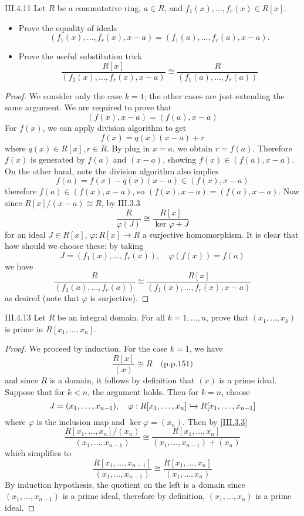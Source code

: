 \begin{problem}{III.4.11}
Let $R$ be a commutative ring, $a \in R$, and $f_1(x),\dotsc,f_r(x) \in R[x]$.
\begin{itemize}
\setlength\itemsep{0pt}
\item Prove the equality of ideals
\[
(f_1(x),\dotsc,f_r(x),x-a) = (f_1(a),\dotsc,f_r(a),x-a).
\]
\item Prove the useful substitution trick
\[
\frac{R[x]}{(f_1(x),\dotsc,f_r(x),x-a)} \cong \frac{R}{(f_1(a),\dotsc,f_r(a))}
\]
\end{itemize}
\end{problem}
\begin{proof}
We consider only the case $k = 1$; the other cases are just extending the same argument. We are required to prove that 
\[
(f(x), x-a) = (f(a), x-a)
\]
For $f(x)$, we can apply division algorithm to get
\[
f(x) = q(x)(x-a) + r
\]
where $q(x) \in R[x], r \in R$. By plug in $x = a$, we obtain $r = f(a)$. Therefore $f(x)$ is generated by $f(a)$ and $(x-a)$, showing $f(x)\in (f(a), x-a)$. On the other hand, note the division algorithm also implies
\[
f(a) = f(x) - q(x)(x-a) \in (f(x), x-a)
\]
therefore $f(a) \in (f(x), x-a)$, so $(f(x), x-a) = (f(a), x-a)$. Now since $R[x]/(x-a) \cong R$, by III.3.3
\[
\frac{R}{\varphi(J)} \cong \frac{R[x]}{\ker \varphi + J}	
\]
for an ideal $J \in R[x]$, $\varphi : R[x] \to R$ a surjective homomorphism. It is clear that how should we choose these: by taking
\[
J = (f_1(x),\dotsc,f_r(x)), \quad \varphi(f(x)) = f(a)	
\]
we have
\[
\frac{R}{(f_1(a),\dotsc,f_r(a))} \cong \frac{R[x]}{(f_1(x),\dotsc,f_r(x),x-a)} 
\]
as desired (note that $\varphi$ is surjective).
\end{proof}

\begin{problem}{III.4.13}
Let $R$ be an integral domain. For all $k = 1,\dotsc, n$, prove that $(x_1,\dotsc, x_k)$ is prime in $R[x_1,\dotsc, x_n]$.
\end{problem}
\begin{proof}
We proceed by induction. For the case $k = 1$, we have
\[
\frac{R[x]}{(x)} \cong R	\quad \text{(p.p.151)}
\]
and since $R$ is a domain, it follows by definition that $(x)$ is a prime ideal. Suppose that for $k < n$, the argument holds. Then for $k = n$, choose
\[
J = (x_1,\dotsc,x_{n-1}), \quad \varphi : R[x_1,\dotsc,x_{n}] \xhookrightarrow{} R[x_1,\dotsc,x_{n-1}]
\]
where $\varphi$ is the inclusion map and $\ker \varphi = (x_n)$. Then by \ref{III.3.3}
\[
\frac{R[x_1,\dotsc,x_{n}]/(x_n)}{(x_1,\dotsc,x_{n-1})} \cong \frac{R[x_1,\dotsc,x_{n}]}{(x_1,\dotsc,x_{n-1})+(x_n)}
\]
which simplifies to
\[
\frac{R[x_1,\dotsc,x_{n-1}]}{(x_1,\dotsc,x_{n-1})} \cong \frac{R[x_1,\dotsc,x_{n}]}{(x_1,\dotsc,x_n)}	
\]
By induction hypothesis, the quotient on the left is a domain since $(x_1,\dotsc,x_{n-1})$ is a prime ideal, therefore by definition, $(x_1,\dotsc,x_n)$ is a prime ideal.
\end{proof}


